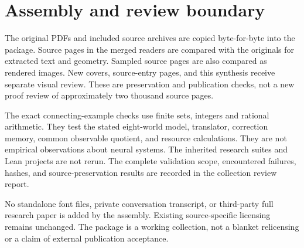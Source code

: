 \documentclass[11pt,oneside]{article}
\begin{document}
\section*{Assembly and review boundary}
The original PDFs and included source archives are copied byte-for-byte into the package. Source pages in the merged readers are compared with the originals for extracted text and geometry. Sampled source pages are also compared as rendered images. New covers, source-entry pages, and this synthesis receive separate visual review. These are preservation and publication checks, not a new proof review of approximately two thousand source pages.

The exact connecting-example checks use finite sets, integers and rational arithmetic. They test the stated eight-world model, translator, correction memory, common observable quotient, and resource calculations. They are not empirical observations about neural systems. The inherited research suites and Lean projects are not rerun. The complete validation scope, encountered failures, hashes, and source-preservation results are recorded in the collection review report.

No standalone font files, private conversation transcript, or third-party full research paper is added by the assembly. Existing source-specific licensing remains unchanged. The package is a working collection, not a blanket relicensing or a claim of external publication acceptance.
\end{document}
